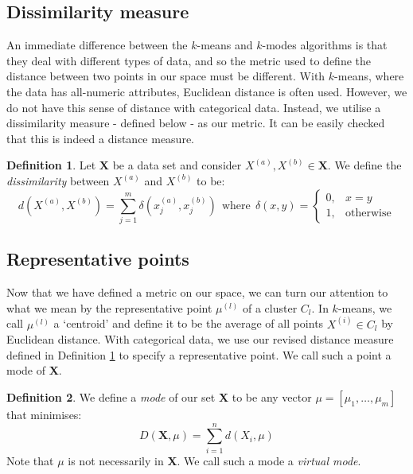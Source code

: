 \documentclass{article}
\theoremstyle{definition}
\newtheorem{definition}{Definition}[section]
\begin{document}
\subsection{Dissimilarity measure}\label{subsection:dissim}

An immediate difference between the $k$-means and $k$-modes algorithms is that 
they deal with different types of data, and so the metric used to define the 
distance between two points in our space must be different. With $k$-means, 
where the data has all-numeric attributes, Euclidean distance is often used. 
However, we do not have this sense of distance with categorical data. Instead, 
we utilise a dissimilarity measure - defined below - as our metric. It can be 
easily checked that this is indeed a distance measure. \\


\begin{definition}\label{def:dissim}
	Let $\textbf{X}$ be a data set and consider $X^{(a)}, X^{(b)} \in 
	\textbf{X}$. We define the \emph{dissimilarity} between $X^{(a)}$ and 
	$X^{(b)}$ to be:
	\[
	d(X^{(a)}, X^{(b)}) = \sum_{j=1}^{m} \delta(x_j^{(a)}, x_j^{(b)}) \ \ 
	\text{where} \ \ \delta(x, y) = \begin{cases}
					0, & x = y \\
					1, & \text{otherwise}
					\end{cases}
	\]
\end{definition}


\subsection{Representative points}\label{subsection:rep-points}

Now that we have defined a metric on our space, we can turn our attention to 
what we mean by the representative point $\mu^{(l)}$ of a cluster $C_l$. In 
$k$-means, we call $\mu^{(l)}$ a `centroid' and define it to be the average of 
all points $X^{(i)} \in C_l$ by Euclidean distance. With categorical data, we 
use our revised distance measure defined in Definition \ref{def:dissim} to 
specify a representative point. We call such a point a mode of \textbf{X}. \\

\begin{definition}\label{def:mode}
	We define a \emph{mode} of our set \textbf{X} to be any vector $\mu = 
	[\mu_1, \ldots, \mu_m]$ that minimises:
	\begin{equation}
		D(\textbf{X}, \mu) = \sum_{i=1}^{n} d(X_i, \mu)
	\end{equation}
	Note that $\mu$ is not necessarily in \textbf{X}. We call such a mode 
	a \emph{virtual mode}.
\end{definition}
\end{document}
